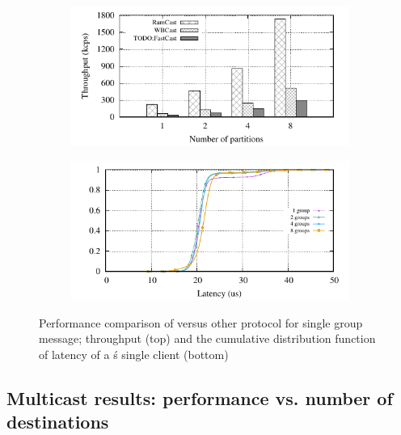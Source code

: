 \begin{figure}[htp!]
  \begin{subfigure}{\columnwidth}
    \centering
    \includegraphics[width=0.99\columnwidth]{figures/benchmark/graphs/figure-genuine-compare-throughput}
  \label{fig:tpcc_repartitioning}
  \end{subfigure}
  \begin{subfigure}{\columnwidth}
    \centering
    \includegraphics[width=0.95\columnwidth]{figures/benchmark/graphs/figure-genuine-compare-latency-cdf}
  \end{subfigure}
  \caption{Performance comparison of \libname versus other protocol for single group message; throughput (top) and the cumulative distribution function of latency of a \libname\'s single client (bottom)}
\end{figure}


\subsection{Multicast results: performance vs. number of destinations}
\label{sec:evaluation:multicast}


